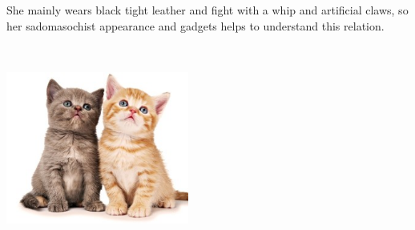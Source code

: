\documentclass[a0,portrait,20pt]{a0poster}
\begin{document}
\begin{multicols}{2}
She mainly wears black tight leather and fight with a whip and artificial claws, so her sadomasochist appearance and gadgets helps to understand this relation.

~

\begin{center}\includegraphics[width=6cm]{chattons.png}\end{center}

\end{multicols}
\end{document}
